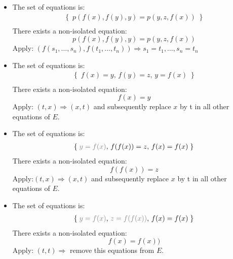 \documentclass[11pt,a4paper]{article}
\begin{document}
\begin{itemize}
\item The set of equations is:
\begin{equation*}
\begin{split}
\left\lbrace  \; p(f (x), f (y), y)= p(y, z, f (x)) \; \right\rbrace  \\
\end{split}
\end{equation*}
There exists a non-isolated equation: 
\begin{equation*}
p(f (x), f (y), y)= p(y, z, f (x))
\end{equation*}
Apply: $(f (s_1 , \dots , s_n ), f (t_1 , \dots , t_n )) \Rightarrow s_1 = t_1 , \dots , s_n = t_n$

\item The set of equations is:
\begin{equation*}
\begin{split}
\left\lbrace  \; f (x) = y, \, f (y)=z , \, y=f(x)\; \right\rbrace  \\
\end{split}
\end{equation*}
There exists a non-isolated equation: 
\begin{equation*}
f (x) = y
\end{equation*}
Apply: $(t, x) \Rightarrow (x,t)$ and subsequently replace $x$ by t in all other equations of $E$.

\item The set of equations is:
\begin{equation*}
\begin{split}
\left\lbrace  \; \textcolor{gray}{y = f(x)}, \, f (f(x))=z ,\, f(x)=f(x)\; \right\rbrace  \\
\end{split}
\end{equation*}
There exists a non-isolated equation: 
\begin{equation*}
f(f(x))=z
\end{equation*}
Apply:$(t, x) \Rightarrow (x,t)$ and subsequently replace $x$ by t in all other equations of $E$.


\item The set of equations is:
\begin{equation*}
\begin{split}
\left\lbrace  \; \textcolor{gray}{y = f(x)}, \, \textcolor{gray}{z=f(f(x))} ,\, f(x)=f(x)\; \right\rbrace  \\
\end{split}
\end{equation*}
There exists a non-isolated equation: 
\begin{equation*}
f(x)=f(x))
\end{equation*}
Apply: $(t, t) \Rightarrow $ remove this equations from $E$.




\end{itemize}
\end{document}
